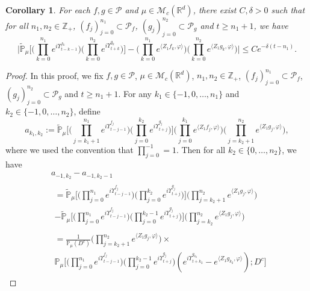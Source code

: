 \documentclass[12pt,a4paper]{amsart}
\theoremstyle{plain}
\newtheorem{cor}[thm]{Corollary}
\theoremstyle{definition}
\numberwithin{equation}{section}
\begin{document}
\begin{cor}
  \label{cor:MI}
For each  $f,g\in \mathcal P$ and $\mu\in \mathcal M_c(\mathbb R^d)$, there exist $C,\delta>0$ such that for
all $n_1,n_2 \in \mathbb Z_+$, $(f_j)_{j=0}^{n_1}\subset \mathcal P_f$, $(g_j)_{j=0}^{n_2}\subset \mathcal P_g$ and $t\geq n_1+1$, we have
\begin{equation}
  \label{32corollary}
  \Big|\mathbb{\widetilde{P}}_{\mu}\Big[  \Big(\prod_{k=0}^{n_1}e^{i \Upsilon^{f_k}_{t-k-1}}\Big)  \Big( \prod_{k=0}^{n_2}e^{i \Upsilon^{g_k}_{t+k} } \Big) \Big]  -  \Big(\prod_{k=0}^{n_1} e^{\langle Z_1f_k, \varphi\rangle}\Big) \Big(\prod_{k=0}^{n_2} e^{\langle Z_1g_k, \varphi\rangle}\Big) \Big|\leq C e^{-\delta (t-n_1)}.
\end{equation}
\end{cor}
\begin{proof}
	In this proof, we fix $f,g\in \mathcal P$, $\mu\in \mathcal M_c(\mathbb R^d)$, $n_1,n_2 \in \mathbb Z_+$, $(f_j)_{j=0}^{n_1}\subset \mathcal P_f$, $(g_j)_{j=0}^{n_2}\subset \mathcal P_g$ and $t\geq n_1 + 1$.
 For any $k_1 \in \{-1,0,\dots,n_1\}$ and $k_2 \in \{-1,0,\dots,n_2\}$,  define
  \[
    a_{k_1,k_2}
    :=  \mathbb{\widetilde{P}}_{\mu}\Big[ \Big(\prod_{j=k_1+1}^{n_1} e^{i\Upsilon_{t-j-1}^{f_j}} \Big)  \Big(\prod_{j=0}^{k_2}e^{i\Upsilon_{t+j}^{g_j}}\Big) \Big] \Big(\prod_{j=0}^{k_1}e^{\langle Z_1 f_j, \varphi\rangle}\Big) \Big(\prod_{j=k_2+1}^{n_2} e^{ \langle Z_1g_j,\varphi \rangle} \Big),
  \]
where we used the convention that 
$\prod_{j=0}^{-1} =1.$
  Then for all  $k_2 \in \{0,\dots,n_2\}$, we have
\begin{align}
&a_{-1,k_2} - a_{-1,k_2-1}
\\& \begin{multlined}
	=\mathbb{\widetilde{P}}_{\mu}\Big[ \Big(\prod_{j=0}^{n_1} e^{i\Upsilon_{t-j-1}^{f_j}} \Big)  \Big(\prod_{j=0}^{k_2}e^{i\Upsilon_{t+j}^{g_j}}\Big) \Big] \Big(\prod_{j=k_2+1}^{n_2} e^{ \langle Z_1g_j,\varphi \rangle} \Big)
	\\- \mathbb{\widetilde{P}}_{\mu}\Big[ \Big(\prod_{j=0}^{n_1} e^{i\Upsilon_{t-j-1}^{f_j}} \Big)  \Big(\prod_{j=0}^{k_2 - 1}e^{i\Upsilon_{t+j}^{g_j}}\Big) \Big] \Big(\prod_{j=k_2}^{n_2} e^{ \langle Z_1g_j,\varphi \rangle} \Big)
\end{multlined}
	\\& \begin{multlined}
	= \frac{1}{\mathbb{P}_{\mu}(D^c)} \Big(\prod_{j=k_2+1}^{ n_2} e^{\langle Z_1g_j, \varphi\rangle}\Big) \times {}
	\\ \mathbb{P}_{\mu}\Big[\Big(\prod_{j=0}^{n_1}e^{i\Upsilon_{t-j-1}^{f_j}}\Big) \Big(\prod_{j=0}^{k_2-1} e^{i\Upsilon_{t+j}^{g_j}}\Big) (e^{i\Upsilon^{g_{k_2}}_{t+k_2}}-e^{\langle Z_1g_{k_2}, \varphi\rangle});D^c\Big] 

\end{multlined}
\end{align}
\end{proof}
\end{document}
